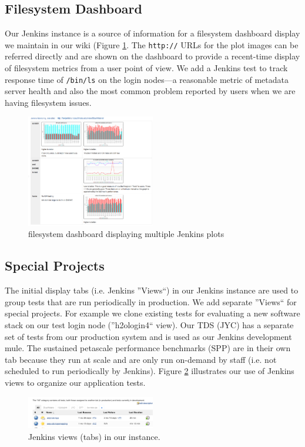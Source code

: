 \documentclass[10pt, conference, compsocconf]{IEEEtran}
\begin{document}
\subsection{Filesystem Dashboard}
Our Jenkins instance is a source of information for a filesystem dashboard display we maintain in our wiki (Figure \ref{fig:wiki-dashboard}. The \texttt{http://} URLs for the plot images can be referred directly and are shown on the dashboard to provide a recent-time display of filesystem metrics from a user point of view. We add a Jenkins test to track response time of \texttt{/bin/ls} on the login nodes---a reasonable metric of metadata server health and also the most common problem reported by users when we are having filesystem issues.
\begin{figure}[H]
\centering
\includegraphics[width=0.5\textwidth]{wiki-dashboard}
\caption{ filesystem dashboard displaying multiple Jenkins plots }
\label{fig:wiki-dashboard}
\end{figure}

\subsection{Special Projects}
The initial display tabs (i.e. Jenkins ''Views``) in our Jenkins instance are used to group tests that are run periodically in production. We add separate ''Views`` for special projects. For example we clone existing tests for evaluating a new software stack on our test login node (''h2ologin4`` view).  Our TDS (JYC) has a separate set of tests from our production system and is used as our Jenkins development mule. The sustained petascale performance benchmarks (SPP) are in their own tab because they run at scale and are only run on-demand by staff (i.e. not scheduled to run periodically by Jenkins). Figure \ref{fig:tabs-display} illustrates our use of Jenkins views to organize our application tests.
\begin{figure}[H]
\centering
\includegraphics[width=0.5\textwidth]{tabs-display}
\caption{Jenkins views (tabs) in our instance.}
\label{fig:tabs-display}
\end{figure}
\end{document}

